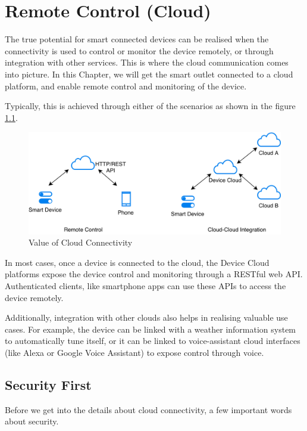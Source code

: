 \documentclass[main.tex]{subfiles}
\begin{document}
\chapter{Remote Control (Cloud)}

The true potential for smart connected devices can be realised when the connectivity is used to control or monitor the device remotely, or through integration with other services. This is where the cloud communication comes into picture. In this Chapter, we will get the smart outlet connected to a cloud platform, and enable remote control and monitoring of the device.

Typically, this is achieved through either of the scenarios as shown in the figure \ref{fig:cloud_connectivity}.

\begin{figure}
    \centering
    \includegraphics[scale=0.4]{../../_static/cloud_connectivity.png}
    \caption{Value of Cloud Connectivity}
    \label{fig:cloud_connectivity}
\end{figure}

In most cases, once a device is connected to the cloud, the Device Cloud platforms expose the device control and monitoring through a RESTful web API. Authenticated clients, like smartphone apps can use these APIs to access the device remotely.

Additionally, integration with other clouds also helps in realising valuable use cases. For example, the device can be linked with a weather information system to automatically tune itself, or it can be linked to voice-assistant cloud interfaces (like Alexa or Google Voice Assistant) to expose control through voice.

\section{Security First}\label{sec:security_first}
Before we get into the details about cloud connectivity, a few important words about security. 
\end{document}
